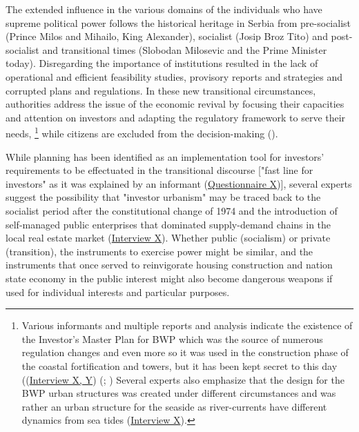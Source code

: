 \documentclass[11pt]{report}
\begin{document}
{{{{\begin{itemize}
The extended influence in the various domains of the individuals who have supreme political power follows the historical heritage in Serbia from pre-socialist (Prince Milos and Mihailo, King Alexander), socialist (Josip Broz Tito) and post-socialist and transitional times (Slobodan Milosevic and the Prime Minister today).  
Disregarding the importance of institutions resulted in the lack of operational and efficient feasibility studies, provisory reports and strategies and corrupted plans and regulations.
In these new transitional circumstances, authorities address the issue of the economic revival by focusing their capacities and attention on investors and adapting the regulatory framework to serve their needs,
\footnote{Various informants and multiple reports and analysis indicate the existence of the Investor’s Master Plan
for BWP which was the source of numerous regulation changes and even more so it was used in the construction phase of the coastal fortification and towers, but it has been kept secret to this day ((\href{InterviewX}{Interview X, Y})
(\href{Alternativni}{\citealt{pravni_skener_alternativni_2016}}; \href{NDVBGD}{\citealt{inicijativa_ne_davimo_beograd_analiza_2016}})
Several experts also emphasize that the design for the BWP urban structures was created under different circumstances and was rather an urban structure for the seaside as river-currents have different dynamics from sea tides (\href{InterviewX}{Interview X}).}
while citizens are excluded from the decision-making (\href{ref}{\citealt{ministarstvo_prostora_urbani_2014}}).

While planning has been identified as an implementation tool for investors' requirements to be effectuated in the transitional discourse ["fast line for investors" as it was explained by an informant (\href{Questionnaire Experts Post-socialist}{Questionnaire X})],
several experts suggest the possibility that "investor urbanism" may be traced back to the socialist period after the constitutional change of 1974 and the introduction of self-managed public enterprises that dominated supply-demand chains in the local real estate market (\href{InterviewX}{Interview X}).
Whether public (socialism) or private (transition), the instruments to exercise power might be similar, and the instruments that once served to reinvigorate housing construction and nation state economy in the public interest might also become dangerous weapons if used for individual interests and particular purposes.


\end{itemize}}}}}
\end{document}
